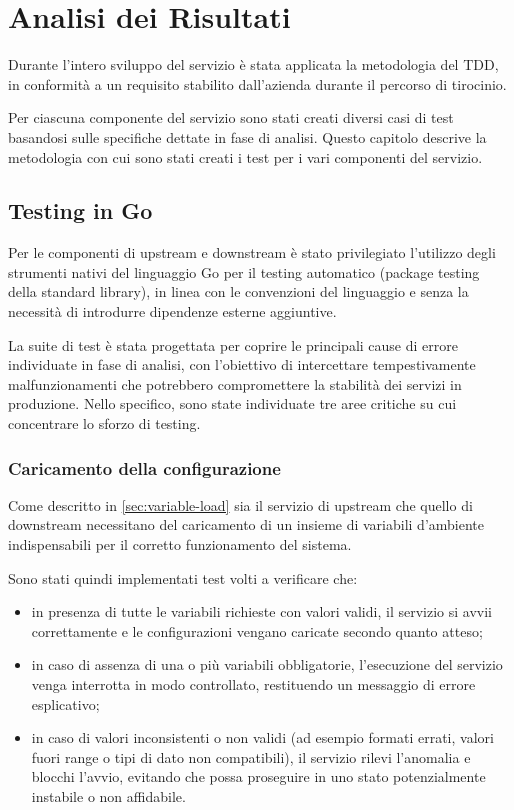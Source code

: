 \chapter{Analisi dei Risultati}
\label{chap:results}
Durante l'intero sviluppo del servizio è stata applicata la metodologia del \ac{TDD}, in conformità a un requisito stabilito dall'azienda durante il percorso di tirocinio.

Per ciascuna componente del servizio sono stati creati diversi casi di test basandosi sulle specifiche dettate in fase di analisi.
Questo capitolo descrive la metodologia con cui sono stati creati i test per i vari componenti del servizio.

\section{Testing in Go}
Per le componenti di upstream e downstream è stato privilegiato l'utilizzo degli strumenti nativi del linguaggio Go per il testing automatico (package testing della standard library), in linea con le convenzioni del linguaggio e senza la necessità di introdurre dipendenze esterne aggiuntive.

La suite di test è stata progettata per coprire le principali cause di errore individuate in fase di analisi, con l'obiettivo di intercettare tempestivamente malfunzionamenti che potrebbero compromettere la stabilità dei servizi in produzione. Nello specifico, sono state individuate tre aree critiche su cui concentrare lo sforzo di testing.

\subsection{Caricamento della configurazione}
Come descritto in \cref{sec:variable-load} sia il servizio di upstream che quello di downstream necessitano del caricamento di un insieme di variabili d'ambiente indispensabili per il corretto funzionamento del sistema.

Sono stati quindi implementati test volti a verificare che:
\begin{itemize}
    \item in presenza di tutte le variabili richieste con valori validi, il servizio si avvii correttamente e le configurazioni vengano caricate secondo quanto atteso;
    \item in caso di assenza di una o più variabili obbligatorie, l'esecuzione del servizio venga interrotta in modo controllato, restituendo un messaggio di errore esplicativo;
    \item in caso di valori inconsistenti o non validi (ad esempio formati errati, valori fuori range o tipi di dato non compatibili), il servizio rilevi l'anomalia e blocchi l'avvio, evitando che possa proseguire in uno stato potenzialmente instabile o non affidabile.
\end{itemize}

